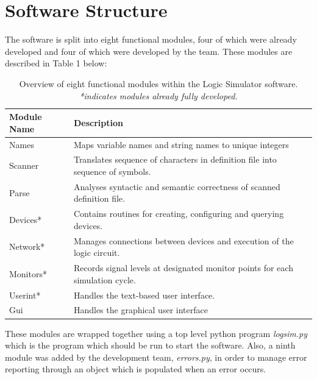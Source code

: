 \documentclass{article}					%
\begin{document}
\section{Software Structure}
The software is split into eight functional modules, four of which were already developed and four of which were developed by the team. These modules are described in Table 1 below:
\begin{table}[h]
\begin{centering}
\begin{tabular}{l|l}
\textbf{Module Name} & \textbf{Description}                                                                    \\ \hline
Names       & Maps variable names and string names to unique integers                        \\
Scanner     & Translates sequence of characters in definition file into sequence of symbols. \\
Parse       & Analyses syntactic and semantic correctness of scanned definition file.        \\
Devices*    & Contains routines for creating, configuring and querying devices.              \\
Network*    & Manages connections between devices and execution of the logic circuit.        \\
Monitors*   & Records signal levels at designated monitor points for each simulation cycle.  \\
Userint*    & Handles the text-based user interface.                                         \\
Gui         & Handles the graphical user interface
\end{tabular}
\caption{Overview of eight functional modules within the Logic Simulator software. \textit{*indicates modules already fully developed.}}
\end{centering}
\end{table}

These modules are wrapped together using a top level python program \textit{logsim.py} which is the program which should be run to start the software. Also, a ninth module was added by the development team, \textit{errors.py}, in order to manage error reporting through an object which is populated when an error occurs.
\end{document}
